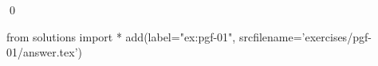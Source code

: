 
\begin{ex} 
  \label{ex:pgf-01}
  
  \qed
\end{ex} 
\begin{python0}
from solutions import *
add(label="ex:pgf-01",
    srcfilename='exercises/pgf-01/answer.tex') 
\end{python0}
